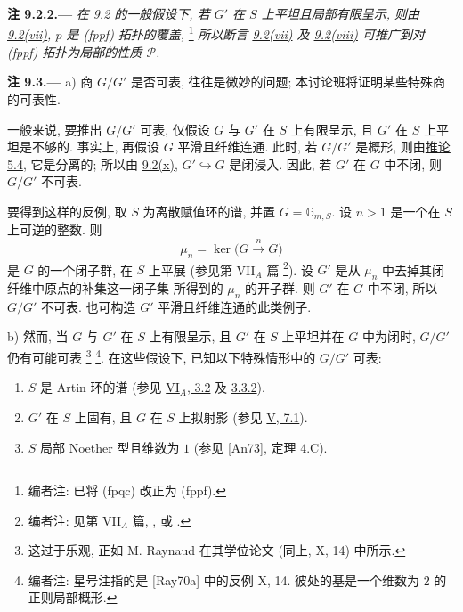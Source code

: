 \medskip
{}\label{rem:sga3-VIB-9.2.2}%
\noindent\textbf{注 9.2.2.---}
\emph{在 \hyperref[prop:sga3-VIB-9.2]{9.2} 的一般假设下,
若 \(G'\) 在 \(S\) 上平坦且局部有限呈示,
则由 \hyperref[concl:sga3-VIB-9.2-vii]{9.2\textup{(vii)}},
\(p\) 是 \textup{(fppf)} 拓扑的覆盖,}%
\footnote{\label{note:sga3-VIB-87}编者注: 已将 \textup{(fpqc)} 改正为 \textup{(fppf)}.}
\emph{所以断言 \hyperref[concl:sga3-VIB-9.2-vii]{9.2\textup{(vii)}} 及
\hyperref[concl:sga3-VIB-9.2-viii]{9.2\textup{(viii)}}
可推广到对 \textup{(fppf)} 拓扑为局部的性质 \(\mathscr P\).}

\medskip
{}\label{rem:sga3-VIB-9.3}%
\noindent\textbf{注 9.3.---}
\label{rem:sga3-VIB-9.3-a}%
\textup{a)} 商 \(G/G'\) 是否可表, 往往是微妙的问题;
本讨论班将证明某些特殊商的可表性.

一般来说, 要推出 \(G/G'\) 可表,
仅假设 \(G\) 与 \(G'\) 在 \(S\) 上有限呈示,
且 \(G'\) 在 \(S\) 上平坦是不够的.
事实上, 再假设 \(G\) 平滑且纤维连通.
此时, 若 \(G/G'\) 是概形,
则由\hyperref[cor:sga3-VIB-5.4]{推论 5.4}, 它是分离的;
所以由 \hyperref[concl:sga3-VIB-9.2-x]{9.2\textup{(x)}},
\(G'\hookrightarrow G\) 是闭浸入.
因此, 若 \(G'\) 在 \(G\) 中不闭, 则 \(G/G'\) 不可表.

要得到这样的反例, 取 \(S\) 为离散赋值环的谱,
并置 \(G=\mathbb G_{m,S}\).
设 \(n>1\) 是一个在 \(S\) 上可逆的整数. 则
\label{form:sga3-VIB-9.3-mu-n}%
\[
  \mu_n=\ker\bigl(G\xrightarrow{\ n\ }G\bigr)
\]
是 \(G\) 的一个闭子群, 在 \(S\) 上平展
(参见第 VII\(_A\) 篇%
\footnote{\label{note:sga3-VIB-88}编者注: 见第 VII\(_A\) 篇,
, 或
.}).
设 \(G'\) 是从 \(\mu_n\) 中去掉其闭纤维中原点的补集这一闭子集
所得到的 \(\mu_n\) 的开子群.
则 \(G'\) 在 \(G\) 中不闭, 所以 \(G/G'\) 不可表.
也可构造 \(G'\) 平滑且纤维连通的此类例子.

\label{rem:sga3-VIB-9.3-b}%
\textup{b)} 然而, 当 \(G\) 与 \(G'\) 在 \(S\) 上有限呈示,
且 \(G'\) 在 \(S\) 上平坦并在 \(G\) 中为闭时,
\(G/G'\) 仍有可能可表%
\begingroup
\renewcommand{\thefootnote}{\fnsymbol{footnote}}%
\footnote[1]{\label{note:sga3-VIB-9.3-star}
这过于乐观, 正如 M. Raynaud 在其学位论文
\textup{(同上, X, 14)} 中所示.}%
\endgroup\hspace{0.15em}%
\footnote{\label{note:sga3-VIB-89}编者注: 星号注指的是
\textup{[Ray70a]} 中的反例 X, 14.
彼处的基是一个维数为 \(2\) 的正则局部概形.}.
在这些假设下, 已知以下特殊情形中的 \(G/G'\) 可表:
\begin{enumerate}
\item[\textup{\(1^\circ\)---}]\label{case:sga3-VIB-9.3-b-1}
  \(S\) 是 Artin 环的谱
  (参见 \hyperref[thm:sga3-VIA-3.2]{VI\(_A\), 3.2} 及
  \hyperref[thm:sga3-VIA-3.3.2]{3.3.2}).

\item[\textup{\(2^\circ\)---}]\label{case:sga3-VIB-9.3-b-2}
  \(G'\) 在 \(S\) 上固有, 且 \(G\) 在 \(S\) 上拟射影
  (参见 \hyperref[thm:sga3-V-7.1]{V, 7.1}).

\item[\textup{\(3^\circ\)---}]\label{case:sga3-VIB-9.3-b-3}
  \(S\) 局部 Noether 型且维数为 \(1\)
  (参见 \textup{[An73]}, 定理 4.C).
\end{enumerate}

